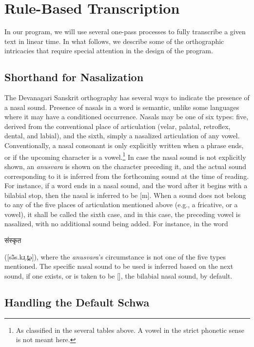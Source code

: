 \documentclass[10pt,a4paper]{article}
\let\ipa\textipa
\newcommand{\sansk}[1]{\begin{sanskrit}#1\end{sanskrit}}
\begin{document}
\section{Rule-Based Transcription}

In our program, we will use several one-pass processes to fully transcribe a given text in linear time. In what follows, we describe some of the orthographic intricacies that require special attention in the design of the program.

\subsection{Shorthand for Nasalization}

The Devanagari Sanskrit orthography has several ways to indicate the presence of a nasal sound. Presence of nasals in a word is semantic, unlike some languages where it may have a conditioned occurrence. Nasals may be one of six types: five, derived from the conventional place of articulation (velar, palatal, retroflex, dental, and labial), and the sixth, simply a nasalized articulation of any vowel. Conventionally, a nasal consonant is only explicitly written when a phrase ends, or if the upcoming character is a vowel.\footnote{As classified in the several tables above. A vowel in the strict phonetic sense is not meant here.} In case the nasal sound is not explicitly shown, an {\it anusvara} is shown on the character preceding it, and the actual sound corresponding to it is inferred from the forthcoming sound at the time of reading. For instance, if a word ends in a nasal sound, and the word after it begins with a bilabial stop, then the nasal is inferred to be [m]. When a sound does not belong to any of the five places of articulation mentioned above (e.g., a fricative, or a vowel), it shall be called the sixth case, and in this case, the preceding vowel is nasalized, with no additional sound being added. For instance, in the word \sansk{संस्कृत} ([sə̃̃s.kɹ̩.t̪ə]), where the {\it anusvara}'s circumstance is not one of the five types mentioned. The specific nasal sound to be used is inferred based on the next sound, if one exists, or is taken to be {[\ipa{m}]}, the bilabial nasal sound, by default.

\subsection{Handling the Default Schwa}
\end{document}
